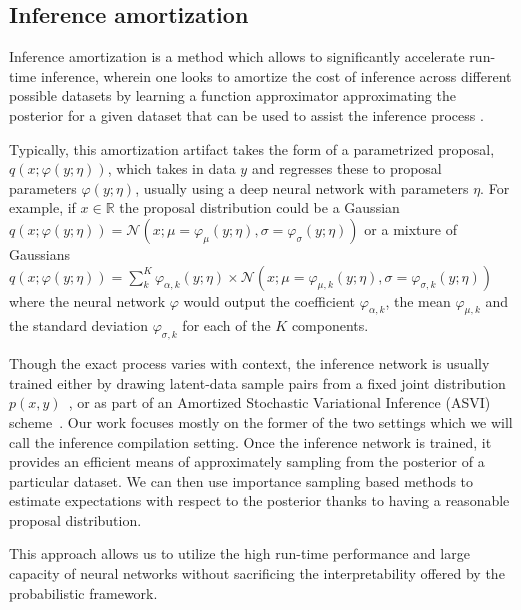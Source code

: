 \documentclass[12pt]{article}
\begin{document}
\subsection{Inference amortization}

Inference amortization is a method which allows to significantly accelerate run-time inference, wherein one looks to amortize the cost of inference across different possible datasets
by learning a
function approximator approximating the posterior for a given dataset
that can be used to assist the inference process
\citep{StuhlmullerEtAl2013, VAE, RitchieEtAl2016, PaigeWood2016, LeEtAl2016, LeEtAl2017, FIVO, NaessethEtAl2017}.

Typically, this amortization
artifact takes the form of a parametrized proposal, $q(x ; \varphi(y; \eta))$, which takes
in data $y$ and regresses these to proposal parameters $\varphi(y; \eta)$, usually using
a deep neural network with parameters $\eta$.
For example, if $x \in \mathbb{R}$ 
the proposal distribution could be a Gaussian 
$q(x ; \varphi(y; \eta)) = \mathcal{N}(x;\mu=\varphi_{\mu}(y; \eta),\sigma=\varphi_{\sigma}(y; \eta))$
or a mixture of Gaussians
$q(x ; \varphi(y; \eta)) = \sum_k^K \varphi_{\alpha,k}(y; \eta) \times \mathcal{N}(x;\mu=\varphi_{\mu,k}(y; \eta),\sigma=\varphi_{\sigma,k}(y; \eta))$
where the neural network $\varphi$ would output 
the coefficient $\varphi_{\alpha,k}$,
the mean $\varphi_{\mu,k}$ and
the standard deviation $\varphi_{\sigma,k}$
for each of the $K$ components.

Though the exact process varies with context,
the inference network is usually trained either by drawing latent-data
sample pairs from a fixed joint distribution
$p(x,y)$~\citep{RitchieEtAl2016,PaigeWood2016,LeEtAl2016}, or 
as part of an Amortized Stochastic Variational Inference (ASVI) scheme~\citep{HoffmanEtAl2013,VAE,RezendeEtAl2014}.
Our work focuses mostly on the former of the two settings which we will call the inference compilation setting.
Once the inference network is trained, it provides an efficient means of approximately
sampling from the posterior of a particular dataset.
We can then use importance sampling based methods to estimate expectations
with respect to the posterior thanks to having a reasonable proposal distribution.

This approach allows us to utilize the high run-time performance and large capacity of neural networks 
without sacrificing the interpretability offered by the probabilistic framework.
 
\end{document}

